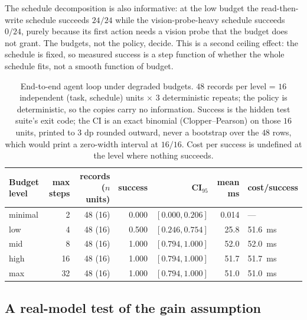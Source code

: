 \documentclass[10pt]{article} %
\begin{document}
The schedule decomposition is also informative: at the low budget the
read-then-write schedule succeeds $24/24$ while the vision-probe-heavy schedule
succeeds $0/24$, purely because its first action needs a vision probe that the
budget does not grant. The budgets, not the policy, decide. This is a second
ceiling effect: the schedule is fixed, so measured success is a step function of
whether the whole schedule fits, not a smooth function of budget.

\begin{table}[t]
\caption{End-to-end agent loop under degraded budgets. $48$ records per level = $16$
independent (task, schedule) units $\times$ $3$ deterministic repeats; the policy is
deterministic, so the copies carry no information. Success is the hidden test suite's exit
code; the CI is an exact binomial (Clopper--Pearson) on those $16$ units, printed to 3 dp rounded outward, never a bootstrap over the $48$ rows, which would print a zero-width interval at $16/16$. Cost per success is undefined at the level where nothing succeeds.}
\label{tab:e3}
\begin{center}
\small
\begin{tabular}{lrrrrrl}
\toprule
Budget level & max steps & records ($n$ units) & success & CI$_{95}$ & mean ms & cost/success \\
\midrule
minimal & 2  & 48 (16) & 0.000 & $[0.000, 0.206]$ & 0.014 & --- \\
low     & 4  & 48 (16) & 0.500 & $[0.246, 0.754]$ & 25.8 & 51.6~ms \\
mid     & 8  & 48 (16) & 1.000 & $[0.794, 1.000]$ & 52.0 & 52.0~ms \\
high    & 16 & 48 (16) & 1.000 & $[0.794, 1.000]$ & 51.7 & 51.7~ms \\
max     & 32 & 48 (16) & 1.000 & $[0.794, 1.000]$ & 51.0 & 51.0~ms \\
\bottomrule
\end{tabular}
\end{center}
\end{table}

\subsection{A real-model test of the gain assumption}
\label{sec:res-h4}
\end{document}
